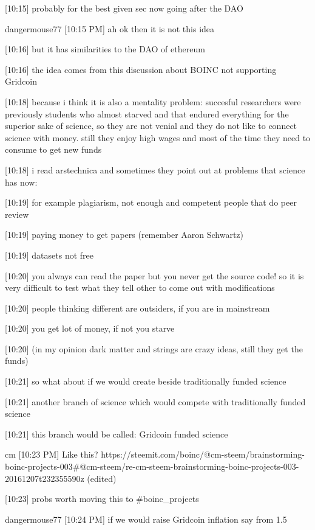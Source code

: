 {[10:15] 
probably for the best given sec now going after the DAO


dangermouse77 [10:15 PM] 
ah ok then it is not this idea


[10:16] 
but it has similarities to the DAO of ethereum


[10:16] 
the idea comes from this discussion about BOINC not supporting Gridcoin


[10:18] 
because i think it is also a mentality problem: succesful researchers were previously students who almost starved and that endured everything for the superior sake of science, so they are not venial and they do not like to connect science with money. still they enjoy high wages and most of the time they need to consume to get new funds


[10:18] 
i read arstechnica and sometimes they point out at problems that science has now:


[10:19] 
for example plagiarism, not enough and competent people that do peer review


[10:19] 
paying money to get papers (remember Aaron Schwartz)


[10:19] 
datasets not free


[10:20] 
you always can read the paper but you never get the source code! so it is very difficult to test what they tell other to come out with modifications


[10:20] 
people thinking different are outsiders, if you are in mainstream


[10:20] 
you get lot of money, if not you starve


[10:20] 
(in my opinion dark matter and strings are crazy ideas, still they get the funds)


[10:21] 
so what about if we would create beside traditionally funded science


[10:21] 
another branch of science which would compete with traditionally funded science


[10:21] 
this branch would be called: Gridcoin funded science


cm 
[10:23 PM] 
Like this? https://steemit.com/boinc/@cm-steem/brainstorming-boinc-projects-003#@cm-steem/re-cm-steem-brainstorming-boinc-projects-003-20161207t232355590z (edited)


[10:23] 
probs worth moving this to #boinc_projects


dangermouse77 [10:24 PM] 
if we would raise Gridcoin inflation say from 1.5%


}
